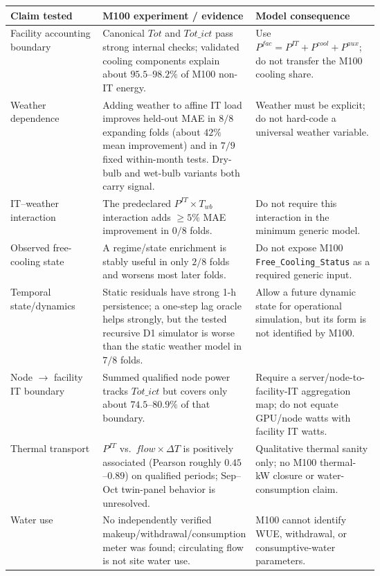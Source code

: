\documentclass[11pt]{article}
\newcommand{\newtxt}[1]{\textcolor{green!45!black}{#1}}
\begin{document}
\begin{center}
\scriptsize
\begin{tabularx}{\linewidth}{@{}p{0.25\linewidth}p{0.37\linewidth}Y@{}}
\toprule
\textbf{Claim tested} & \textbf{M100 experiment / evidence} & \textbf{Model consequence} \\
\midrule
\newtxt{Facility accounting boundary} &
\newtxt{Canonical \(Tot\) and \(Tot\_ict\) pass strong internal checks; validated cooling components explain about \(95.5\)--\(98.2\%\) of M100 non-IT energy.} &
\newtxt{Use \(P^{fac}=P^{IT}+P^{cool}+P^{aux}\); do not transfer the M100 cooling share.} \\

\newtxt{Weather dependence} &
\newtxt{Adding weather to affine IT load improves held-out MAE in \(8/8\) expanding folds (about \(42\%\) mean improvement) and in \(7/9\) fixed within-month tests. Dry-bulb and wet-bulb variants both carry signal.} &
\newtxt{Weather must be explicit; do not hard-code a universal weather variable.} \\

\newtxt{IT--weather interaction} &
\newtxt{The predeclared \(P^{IT}\!\times T_{wb}\) interaction adds \(\ge5\%\) MAE improvement in \(0/8\) folds.} &
\newtxt{Do not require this interaction in the minimum generic model.} \\

\newtxt{Observed free-cooling state} &
\newtxt{A regime/state enrichment is stably useful in only \(2/8\) folds and worsens most later folds.} &
\newtxt{Do not expose M100 \texttt{Free\_Cooling\_Status} as a required generic input.} \\

\newtxt{Temporal state/dynamics} &
\newtxt{Static residuals have strong 1-h persistence; a one-step lag oracle helps strongly, but the tested recursive D1 simulator is worse than the static weather model in \(7/8\) folds.} &
\newtxt{Allow a future dynamic state for operational simulation, but its form is not identified by M100.} \\

\newtxt{Node \(\rightarrow\) facility IT boundary} &
\newtxt{Summed qualified node power tracks \(Tot\_ict\) but covers only about \(74.5\)--\(80.9\%\) of that boundary.} &
\newtxt{Require a server/node-to-facility-IT aggregation map; do not equate GPU/node watts with facility IT watts.} \\

\newtxt{Thermal transport} &
\newtxt{\(P^{IT}\) vs.\ \(flow\times\Delta T\) is positively associated (Pearson roughly \(0.45\)--\(0.89\)) on qualified periods; Sep--Oct twin-panel behavior is unresolved.} &
\newtxt{Qualitative thermal sanity only; no M100 thermal-kW closure or water-consumption claim.} \\

\newtxt{Water use} &
\newtxt{No independently verified makeup/withdrawal/consumption meter was found; circulating flow is not site water use.} &
\newtxt{M100 cannot identify WUE, withdrawal, or consumptive-water parameters.} \\
\bottomrule
\end{tabularx}
\end{center}
\end{document}
